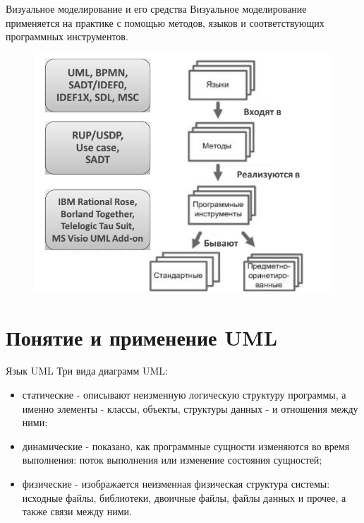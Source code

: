 \documentclass{beamer}
\begin{document}
\begin{frame}[t]{Визуальное моделирование и его средства}
Визуальное моделирование применяется на практике с помощью методов, языков и соответствующих программных инструментов.
\begin{figure}[h]
\centering
\includegraphics[scale=0.45]{images/lec03-pic02.png}
\end{figure}
\end{frame} 

\section{Понятие и применение UML}

\begin{frame}[t]{Язык UML}
Три вида диаграмм UML:
\begin{itemize}
\item статические - описывают неизменную логическую структуру программы, а именно элементы - классы, объекты, структуры данных - и отношения между ними;
\item динамические - показано, как программные сущности изменяются во время выполнения: поток выполнения или изменение состояния сущностей;
\item физические - изображается неизменная физическая структура системы: исходные файлы, библиотеки, двоичные файлы, файлы данных и прочее, а также связи между ними.
\end{itemize}
\end{frame}

\end{document}
